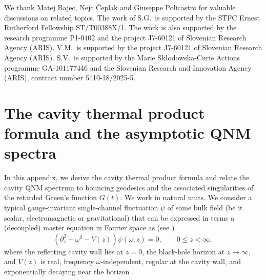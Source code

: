 \documentclass[prd,aps,twocolumn,amsfonts,showpacs,superscriptaddress,preprintnumbers,nofootinbib]{revtex4-2}
\begin{document}

\begin{acknowledgments}
We thank Matej Bajec, Nejc Čeplak and Giuseppe Policastro for valuable discussions on related topics. The work of S.G.\ is supported by the STFC Ernest Rutherford Fellowship ST/T00388X/1. The work is also supported by the research programme P1-0402 and the project J7-60121 of Slovenian Research Agency (ARIS). V.M.\ is supported by the project J7-60121 of Slovenian Research Agency (ARIS). S.V.\ is supported by the Marie Skłodowska-Curie Actions programme GA-101177446 and the Slovenian Research and Innovation Agency (ARIS), contract number 5110-18/2025-5.
\end{acknowledgments}


\appendix

\section{The cavity thermal product formula and the asymptotic QNM spectra}\label{App:CTPF}

In this appendix, we derive the cavity thermal product formula and relate the cavity QNM spectrum to bouncing geodesics and the associated singularities of the retarded Green's function $G(t)$. We work in natural units. We consider a typical gauge-invariant single-channel fluctuation $\psi$ of some bulk field (be it scalar, electromagnetic or gravitational) that can be expressed in terms a (decoupled) master equation in Fourier space as (see \cite{Grozdanov:2023txs,Dodelson:2023vrw,Grozdanov:2026ktq})
\begin{equation}
\label{eq:Schrodinger FT}
    \left(\partial_z^2+\omega^2-V(z)\right)\psi(\omega,z)=0,
    \qquad 0\leq z<\infty,
\end{equation}
where the reflecting cavity wall lies at $z=0$, the black-hole horizon at $z\to\infty$, and $V(z)$ is real, frequency $\omega$-independent, regular at the cavity wall, and exponentially decaying near the horizon \cite{Grozdanov:2026ktq}.
\end{document}
